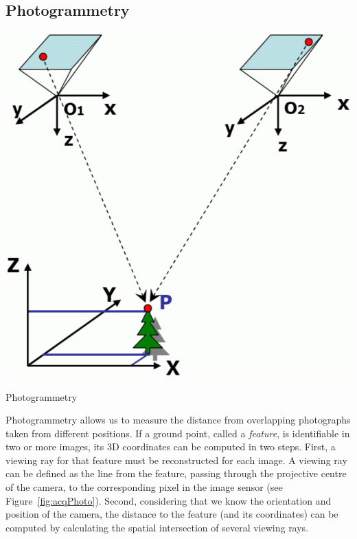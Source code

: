 \subsection{Photogrammetry}%
\label{sec:photogrammetry}
\begin{marginfigure}
	\centering
	\includegraphics[width=\textwidth]{figs/photogrammetry.png}
	\caption{Photogrammetry}%
	\label{fig:acqPhoto}
\end{marginfigure}
Photogrammetry allows us to measure the distance from overlapping photographs taken from different positions. 
If a ground point, called a \emph{feature}, is identifiable in two or more images, its 3D coordinates can be computed in two steps. 
First, a viewing ray for that feature must be reconstructed for each image. 
A viewing ray can be defined as the line from the feature, passing through the projective centre of the camera, to the corresponding pixel in the image sensor (see Figure~\ref{fig:acqPhoto}). 
Second, considering that we know the orientation and position of the camera, the distance to the feature (and its coordinates) can be computed by calculating the spatial intersection of several viewing rays.


